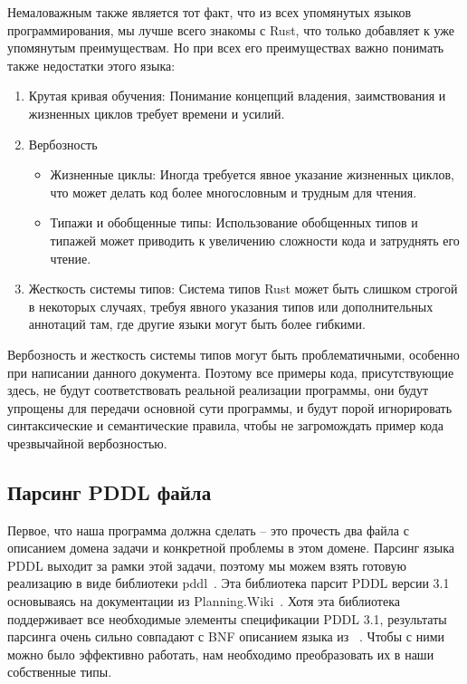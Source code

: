 \documentclass{article}
\begin{document}
Немаловажным также является тот факт, что из всех упомянутых языков программирования,
мы лучше всего знакомы с Rust, что только добавляет к уже упомянутым преимуществам.
Но при всех его преимуществах важно понимать также недостатки этого языка:

\begin{enumerate}
  \item Крутая кривая обучения: Понимание концепций владения, заимствования и жизненных циклов требует времени и усилий.
  \item Вербозность
    \begin{itemize}
      \item Жизненные циклы: Иногда требуется явное указание жизненных циклов, что может делать код более многословным и трудным для чтения.
      \item Типажи и обобщенные типы: Использование обобщенных типов и типажей может приводить к увеличению сложности кода и затруднять его чтение.
    \end{itemize}
  \item Жесткость системы типов: Система типов Rust может быть слишком строгой в некоторых случаях, требуя явного указания типов или дополнительных аннотаций там, где другие языки могут быть более гибкими.
\end{enumerate}

Вербозность и жесткость системы типов могут быть проблематичными,
особенно при написании данного документа.
Поэтому все примеры кода, присутствующие здесь,
не будут соответствовать реальной реализации программы,
они будут упрощены для передачи основной сути программы,
и будут порой игнорировать синтаксические и семантические правила,
чтобы не загромождать пример кода чрезвычайной вербозностью.

\subsection{Парсинг PDDL файла}

Первое, что наша программа должна сделать -- это прочесть два файла с описанием домена задачи
и конкретной проблемы в этом домене. Парсинг языка PDDL выходит за рамки этой задачи,
поэтому мы можем взять готовую реализацию в виде библиотеки pddl~\cite{pddl-crate}.
Эта библиотека парсит PDDL версии 3.1 основываясь на документации из Planning.Wiki~\cite{planning-wiki}.
Хотя эта библиотека поддерживает все необходимые элементы спецификации PDDL 3.1,
результаты парсинга очень сильно совпадают с BNF описанием языка из ~\cite{pddl-bnf}. 
Чтобы с ними можно было эффективно работать, нам необходимо преобразовать их в наши собственные типы.
\end{document}
